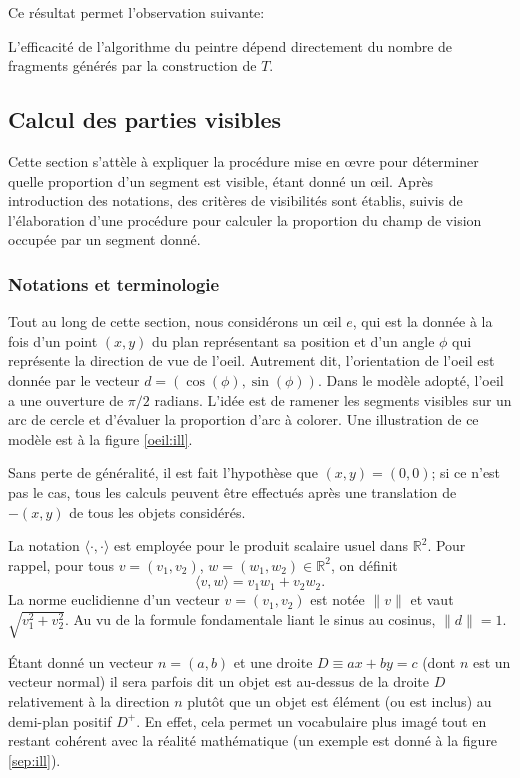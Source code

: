 Ce résultat permet l'observation suivante:
\begin{cor}
  L'efficacité de l'algorithme du peintre dépend directement
  du nombre de fragments générés par la construction de $T$.
\end{cor}
\subsection{Calcul des parties visibles}
Cette section s'attèle à expliquer la procédure mise en \oe{}vre pour déterminer
quelle proportion d'un segment est visible, étant donné un \oe{}il.
Après introduction des notations, des critères de visibilités sont
établis, suivis de l'élaboration d'une procédure pour calculer la
proportion du champ de vision occupée par un segment donné.

\subsubsection{Notations et terminologie}
Tout au long de cette section, nous considérons un \oe{}il $e$, qui est la donnée à
la fois d'un point $(x, y)$ du plan représentant sa position et d'un angle $\phi$
qui représente la direction de vue de l'oeil. Autrement dit, l'orientation de
l'oeil est donnée par le vecteur $d=(\cos(\phi), \sin(\phi))$. Dans le modèle
adopté, l'oeil a une ouverture de $\pi/2$ radians. L'idée est de ramener
les segments visibles sur un arc de cercle et d'évaluer la proportion d'arc
à colorer. Une illustration de ce modèle est à la figure \ref{oeil:ill}.



Sans perte de généralité, il est fait l'hypothèse que $(x, y) = (0, 0)$;
si ce n'est pas le cas, tous les
calculs peuvent être effectués après une translation de $-(x, y)$ de tous
les objets considérés.

La notation $\langle \cdot,\cdot\rangle$ est employée pour le produit scalaire usuel
dans $\mathbb R^2$. Pour rappel, pour tous $v=(v_1, v_2)$,
$w=(w_1, w_2)\in\mathbb R^2$, on définit
$$\langle v, w\rangle = v_1 w_1 + v_2 w_2.$$
La norme euclidienne d'un vecteur $v = (v_1, v_2)$ est notée
$\|v\|$ et vaut $\sqrt{v_1^2 + v_2^2}$. Au vu de la formule fondamentale liant le
sinus au cosinus, $\|d\| = 1$.

\'Etant  donné un vecteur $n = (a, b)$ et une droite $D\equiv ax+by=c$
(dont $n$ est un vecteur normal) il sera parfois dit
\og un objet est au-dessus de la droite $D$ relativement à la direction $n$\fg{}
plutôt que \og{}un objet est élément (ou est inclus) au demi-plan positif $D^+$\fg{}.
En effet, cela permet un vocabulaire plus imagé tout en restant cohérent
avec la réalité mathématique (un exemple est donné à la figure \ref{sep:ill}).

